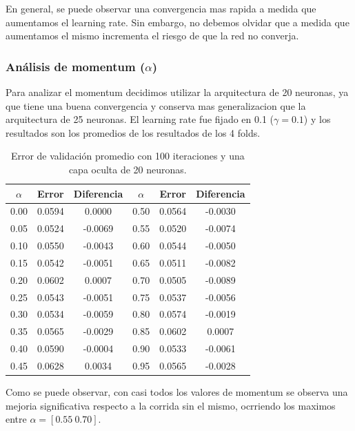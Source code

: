 \documentclass[informe.tex]{subfiles}
\begin{document}
    En general, se puede observar una convergencia mas rapida a medida que aumentamos el learning rate. Sin embargo, no debemos olvidar que a medida que aumentamos el mismo incrementa el riesgo de que la red no converja.
    

    \subsubsection{An\'alisis de momentum ($\alpha$)}
    
    Para analizar el momentum decidimos utilizar la arquitectura de 20 neuronas, ya que tiene una buena convergencia y conserva mas generalizacion que la arquitectura de 25 neuronas. El learning rate fue fijado en 0.1 ($\gamma = 0.1$) y los resultados son los promedios de los resultados de los 4 folds.
    
    \begin{table}[H]
      \begin{center}
	\begin{tabular}{|c|c|c|c|c|c|}
	\hline
	$\alpha$ & Error & Diferencia & $\alpha$ & Error & Diferencia  \\ 
	\hline
	0.00 & 0.0594 & 0.0000 & 0.50 & 0.0564 & -0.0030 \\
	\hline
	0.05 & 0.0524 & -0.0069 & 0.55 & 0.0520 & -0.0074 \\
	\hline
	0.10 & 0.0550 & -0.0043 & 0.60 & 0.0544 & -0.0050 \\
	\hline
	0.15 & 0.0542 & -0.0051 & 0.65 & 0.0511 & -0.0082 \\
	\hline
	0.20 & 0.0602 & 0.0007 & 0.70 & 0.0505 & -0.0089 \\
	\hline
	0.25 & 0.0543 & -0.0051 & 0.75 & 0.0537 & -0.0056 \\
	\hline
	0.30 & 0.0534 & -0.0059 & 0.80 & 0.0574 & -0.0019 \\
	\hline
	0.35 & 0.0565 & -0.0029 & 0.85 & 0.0602 & 0.0007 \\
	\hline
	0.40 & 0.0590 & -0.0004 & 0.90 & 0.0533 & -0.0061 \\
	\hline
	0.45 & 0.0628 & 0.0034 & 0.95 & 0.0565 & -0.0028 \\
	\hline
	\end{tabular}
	\caption{Error de validación promedio con 100 iteraciones y una capa oculta de 20 neuronas.}
	\label{tab:error-d1-f1}
      \end{center}
    \end{table}
    
    Como se puede observar, con casi todos los valores de momentum se observa una mejoria significativa respecto a la corrida sin el mismo, ocrriendo los maximos entre $\alpha = [0.55\ 0.70]$.
    
\end{document}
